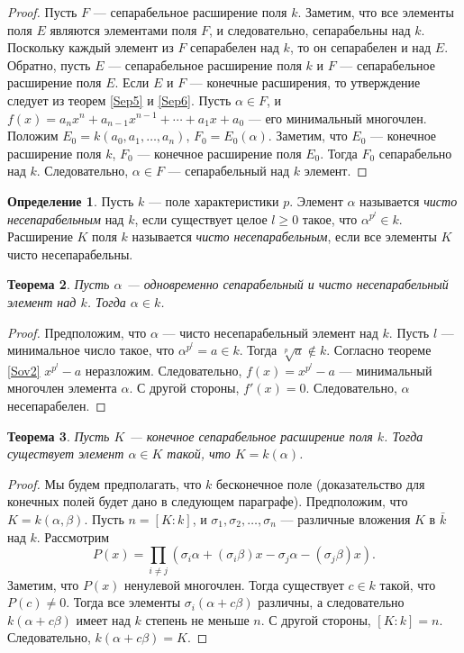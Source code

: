 \documentclass[12pt, titlepage, oneside]{amsbook}
\newtheorem{theorem}{Теорема}[chapter]
\theoremstyle{definition}
\newtheorem{definition}[theorem]{Определение}
\theoremstyle{remark}
\begin{document}
\begin{proof}
Пусть $F$ --- сепарабельное расширение поля $k$. Заметим, что все элементы поля $E$ являются элементами поля $F$, и следовательно, сепарабельны над $k$. Поскольку каждый элемент из $F$ сепарабелен над $k$, то он сепарабелен и над $E$. Обратно, пусть $E$ --- сепарабельное расширение поля $k$ и $F$ --- сепарабельное расширение поля $E$. Если $E$ и $F$ --- конечные расширения, то утверждение следует из теорем \ref{Sep5} и \ref{Sep6}. Пусть $\alpha\in F$, и $f(x)=a_nx^n+a_{n-1}x^{n-1}+\cdots+a_1x+a_0$ --- его минимальный многочлен. Положим $E_0=k(a_0,a_1,\ldots,a_n)$, $F_0=E_0(\alpha)$. Заметим, что $E_0$ --- конечное расширение поля $k$, $F_0$ --- конечное расширение поля $E_0$. Тогда $F_0$ сепарабельно над $k$. Следовательно, $\alpha\in F$ --- сепарабельный над $k$ элемент.
\end{proof}

\begin{definition}
Пусть $k$ --- поле характеристики $p$. Элемент $\alpha$ называется \emph{чисто несепарабельным} над $k$, если существует целое $l\geq 0$ такое, что $\alpha^{p^l}\in k$. Расширение $K$ поля $k$ называется \emph{чисто несепарабельным}, если все элементы $K$ чисто несепарабельны.
\end{definition}

\begin{theorem}
\label{Sep8}
Пусть $\alpha$ --- одновременно сепарабельный и чисто несепарабельный элемент над $k$. Тогда $\alpha\in k$.
\end{theorem}

\begin{proof}
Предположим, что $\alpha$ --- чисто несепарабельный элемент над $k$. Пусть $l$ --- минимальное число такое, что $\alpha^{p^l}=a\in k$. Тогда $\sqrt[p]{a}\not\in k$. Согласно теореме \ref{Sov2} $x^{p^l}-a$ неразложим. Следовательно, $f(x)=x^{p^l}-a$ --- минимальный многочлен элемента $\alpha$. С другой стороны, $f'(x)=0$. Следовательно, $\alpha$ несепарабелен.
\end{proof}

\begin{theorem}
\label{Sep9}
Пусть $K$ --- конечное сепарабельное расширение поля $k$. Тогда существует элемент $\alpha\in K$ такой, что $K=k(\alpha)$.
\end{theorem}

\begin{proof}
Мы будем предполагать, что $k$ бесконечное поле (доказательство для конечных полей будет дано в следующем параграфе).
Предположим, что $K=k(\alpha,\beta)$. Пусть $n=[K:k]$, и $\sigma_1,\sigma_2,\ldots,\sigma_n$ --- различные вложения $K$ в $\bar{k}$ над $k$. Рассмотрим $$P(x)=\prod\limits_{i\neq j}(\sigma_i\alpha+(\sigma_i\beta)x-\sigma_j\alpha-(\sigma_j\beta)x).$$ Заметим, что $P(x)$ ненулевой многочлен. Тогда существует $c\in k$ такой, что $P(c)\neq 0$. Тогда все элементы $\sigma_i(\alpha+c\beta)$ различны, а следовательно $k(\alpha+c\beta)$ имеет над $k$ степень не меньше $n$. С другой стороны, $[K:k]=n$. Следовательно, $k(\alpha+c\beta)=K$.
\end{proof}
\end{document}
